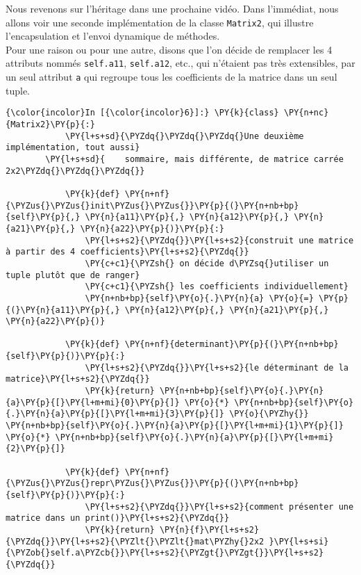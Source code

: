     Nous revenons sur l'héritage dans une prochaine vidéo. Dans l'immédiat,
nous allons voir une seconde implémentation de la classe
\texttt{Matrix2}, qui illustre l'encapsulation et l'envoi dynamique de
méthodes.\\

    Pour une raison ou pour une autre, disons que l'on décide de remplacer
les 4 attributs nommés \texttt{self.a11}, \texttt{self.a12}, etc., qui
n'étaient pas très extensibles, par un seul attribut \texttt{a} qui
regroupe tous les coefficients de la matrice dans un seul tuple.

    \begin{Verbatim}[commandchars=\\\{\}]
{\color{incolor}In [{\color{incolor}6}]:} \PY{k}{class} \PY{n+nc}{Matrix2}\PY{p}{:}
            \PY{l+s+sd}{\PYZdq{}\PYZdq{}\PYZdq{}Une deuxième implémentation, tout aussi}
        \PY{l+s+sd}{    sommaire, mais différente, de matrice carrée 2x2\PYZdq{}\PYZdq{}\PYZdq{}}
            
            \PY{k}{def} \PY{n+nf}{\PYZus{}\PYZus{}init\PYZus{}\PYZus{}}\PY{p}{(}\PY{n+nb+bp}{self}\PY{p}{,} \PY{n}{a11}\PY{p}{,} \PY{n}{a12}\PY{p}{,} \PY{n}{a21}\PY{p}{,} \PY{n}{a22}\PY{p}{)}\PY{p}{:}
                \PY{l+s+s2}{\PYZdq{}}\PY{l+s+s2}{construit une matrice à partir des 4 coefficients}\PY{l+s+s2}{\PYZdq{}}
                \PY{c+c1}{\PYZsh{} on décide d\PYZsq{}utiliser un tuple plutôt que de ranger}
                \PY{c+c1}{\PYZsh{} les coefficients individuellement}
                \PY{n+nb+bp}{self}\PY{o}{.}\PY{n}{a} \PY{o}{=} \PY{p}{(}\PY{n}{a11}\PY{p}{,} \PY{n}{a12}\PY{p}{,} \PY{n}{a21}\PY{p}{,} \PY{n}{a22}\PY{p}{)}
                
            \PY{k}{def} \PY{n+nf}{determinant}\PY{p}{(}\PY{n+nb+bp}{self}\PY{p}{)}\PY{p}{:}
                \PY{l+s+s2}{\PYZdq{}}\PY{l+s+s2}{le déterminant de la matrice}\PY{l+s+s2}{\PYZdq{}}
                \PY{k}{return} \PY{n+nb+bp}{self}\PY{o}{.}\PY{n}{a}\PY{p}{[}\PY{l+m+mi}{0}\PY{p}{]} \PY{o}{*} \PY{n+nb+bp}{self}\PY{o}{.}\PY{n}{a}\PY{p}{[}\PY{l+m+mi}{3}\PY{p}{]} \PY{o}{\PYZhy{}} \PY{n+nb+bp}{self}\PY{o}{.}\PY{n}{a}\PY{p}{[}\PY{l+m+mi}{1}\PY{p}{]} \PY{o}{*} \PY{n+nb+bp}{self}\PY{o}{.}\PY{n}{a}\PY{p}{[}\PY{l+m+mi}{2}\PY{p}{]}
            
            \PY{k}{def} \PY{n+nf}{\PYZus{}\PYZus{}repr\PYZus{}\PYZus{}}\PY{p}{(}\PY{n+nb+bp}{self}\PY{p}{)}\PY{p}{:}
                \PY{l+s+s2}{\PYZdq{}}\PY{l+s+s2}{comment présenter une matrice dans un print()}\PY{l+s+s2}{\PYZdq{}}
                \PY{k}{return} \PY{n}{f}\PY{l+s+s2}{\PYZdq{}}\PY{l+s+s2}{\PYZlt{}\PYZlt{}mat\PYZhy{}2x2 }\PY{l+s+si}{\PYZob{}self.a\PYZcb{}}\PY{l+s+s2}{\PYZgt{}\PYZgt{}}\PY{l+s+s2}{\PYZdq{}}
\end{Verbatim}


